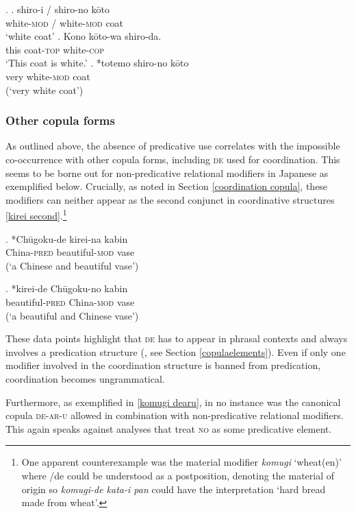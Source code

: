 \ex. \ag. shiro-i / shiro-no kōto\\
white-\textsc{mod} / white-\textsc{mod} coat\\
`white coat' \null \hfill \citep{koopman:2016:further}
\bg. Kono kōto-wa shiro-da.\\
this coat-\textsc{top} white-\textsc{cop}\\
`This coat is white.’
\cg. *totemo shiro-no kōto\\
very white-\textsc{mod} coat\\
(`very white coat’) \label{totemoshiro}

\subsubsection{Other copula forms}

As outlined above, the absence of predicative use correlates with the impossible co-occurrence with other copula forms, including \textsc{de} used for coordination. This seems to be borne out for non-predicative relational modifiers in Japanese as exemplified below. Crucially, as noted in Section \ref{coordination copula}, these modifiers can neither appear as the second conjunct in coordinative structures \ref{kirei second}.\footnote{One apparent counterexample was the material modifier \textit{komugi} `wheat(en)' where /de could be understood as a postposition, denoting the material of origin so \textit{komugi-de kata-i pan} could have the interpretation `hard bread made from wheat'.}  

\exg. *Chūgoku-de kirei-na kabin\\
China-\textsc{pred} beautiful-\textsc{mod} vase\\
(`a Chinese and beautiful vase’)

\exg. *kirei-de Chūgoku-no kabin\\
beautiful-\textsc{pred} China-\textsc{mod} vase\\
(`a beautiful and Chinese vase’) \label{kirei second}

These data points highlight that \textsc{de} has to appear in phrasal contexts and always involves a predication structure (\citealt{bowers:1993:predication}, see Section \ref{copulaelements}). Even if only one modifier involved in the coordination structure is banned from predication, coordination becomes ungrammatical.

Furthermore, as exemplified in \ref{komugi dearu}, in no instance was the canonical copula \textsc{de-ar-u} allowed in combination with non-predicative relational modifiers. This again speaks against analyses that treat \textsc{no} as some predicative element.

